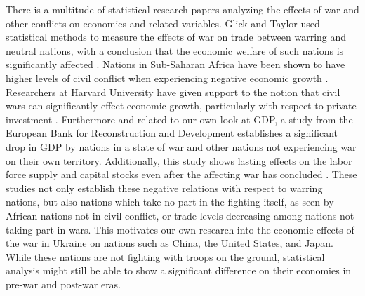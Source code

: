 \documentclass[11pt,regno]{amsart}
\theoremstyle{plain}
\numberwithin{equation}{section}
\begin{document}
There is a multitude of statistical research papers analyzing the effects of war and other conflicts on economies and related variables. Glick and Taylor used statistical methods to measure the effects of war on trade between warring and neutral nations, with a conclusion that the economic welfare of such nations is significantly affected \cite{Glick} . Nations in Sub-Saharan Africa have been shown to have higher levels of civil conflict when experiencing negative economic growth \cite{subafrica}. Researchers at Harvard University have given support to the notion that civil wars can significantly effect economic growth, particularly with respect to private investment \cite{economic_civil_war}. Furthermore and related to our own look at GDP, a study from the European Bank for Reconstruction and Development establishes a significant drop in GDP by nations in a state of war and other nations not experiencing war on their own territory. Additionally, this study shows lasting effects on the labor force supply and capital stocks even after the affecting war has concluded \cite{european_bank}. These studies not only establish these negative relations with respect to warring nations, but also nations which take no part in the fighting itself, as seen by African nations not in civil conflict, or trade levels decreasing among nations not taking part in wars. This motivates our own research into the economic effects of the war in Ukraine on nations such as China, the United States, and Japan. While these nations are not fighting with troops on the ground, statistical analysis might still be able to show a significant difference on their economies in pre-war and post-war eras. 
\end{document}
